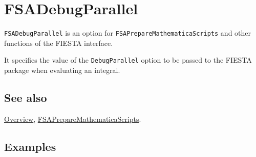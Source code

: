 \documentclass[../FeynHelpersManual.tex]{subfiles}
\begin{document}
\hypertarget{fsadebugparallel}{
\section{FSADebugParallel}\label{fsadebugparallel}}

\texttt{FSADebugParallel} is an option for
\texttt{FSAPrepareMathematicaScripts} and other functions of the FIESTA
interface.

It specifies the value of the \texttt{DebugParallel} option to be passed
to the FIESTA package when evaluating an integral.

\subsection{See also}

\hyperlink{toc}{Overview},
\hyperlink{fsapreparemathematicascripts}{FSAPrepareMathematicaScripts}.

\subsection{Examples}
\end{document}
